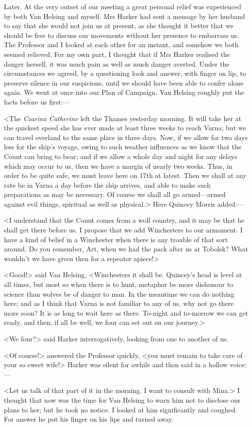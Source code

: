 \begin{diary}{Later.}
At the very outset of our meeting a great personal relief was experienced by both Van Helsing and myself. Mrs Harker had sent a message by her husband to say that she would not join us at present, as she thought it better that we should be free to discuss our movements without her presence to embarrass us. The Professor and I looked at each other for an instant, and somehow we both seemed relieved. For my own part, I thought that if Mrs Harker realised the danger herself, it was much pain as well as much danger averted. Under the circumstances we agreed, by a questioning look and answer, with finger on lip, to preserve silence in our suspicions, until we should have been able to confer alone again. We went at once into our Plan of Campaign. Van Helsing roughly put the facts before us first:—

<The \textit{Czarina Catherine} left the Thames yesterday morning. It will take her at the quickest speed she has ever made at least three weeks to reach Varna; but we can travel overland to the same place in three days. Now, if we allow for two days less for the ship's voyage, owing to such weather influences as we know that the Count can bring to bear; and if we allow a whole day and night for any delays which may occur to us, then we have a margin of nearly two weeks. Thus, in order to be quite safe, we must leave here on 17th at latest. Then we shall at any rate be in Varna a day before the ship arrives, and able to make such preparations as may be necessary. Of course we shall all go armed—armed against evil things, spiritual as well as physical.> Here Quincey Morris added:—

<I understand that the Count comes from a wolf country, and it may be that he shall get there before us. I propose that we add Winchesters to our armament. I have a kind of belief in a Winchester when there is any trouble of that sort around. Do you remember, Art, when we had the pack after us at Tobolsk? What wouldn't we have given then for a repeater apiece!>

<Good!> said Van Helsing, <Winchesters it shall be. Quincey's head is level at all times, but most so when there is to hunt, metaphor be more dishonour to science than wolves be of danger to man. In the meantime we can do nothing here; and as I think that Varna is not familiar to any of us, why not go there more soon? It is as long to wait here as there. To-night and to-morrow we can get ready, and then, if all be well, we four can set out on our journey.>

<We four?> said Harker interrogatively, looking from one to another of us.

<Of course!> answered the Professor quickly, <you must remain to take care of your so sweet wife!> Harker was silent for awhile and then said in a hollow voice:—

<Let us talk of that part of it in the morning. I want to consult with Mina.> I thought that now was the time for Van Helsing to warn him not to disclose our plans to her; but he took no notice. I looked at him significantly and coughed. For answer he put his finger on his lips and turned away.
\end{diary}

